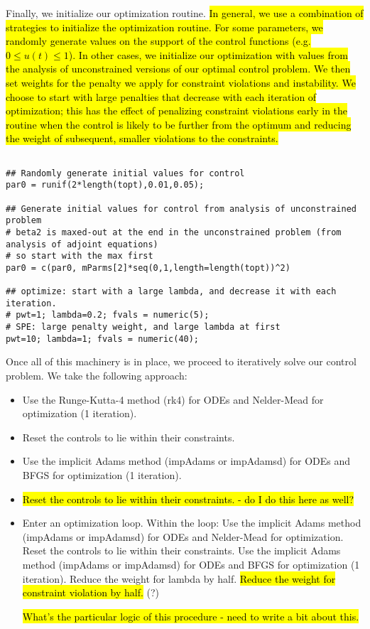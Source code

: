 \documentclass[12pt, oneside]{article}   	%
\begin{document}
Finally, we initialize our optimization routine. \hl{In general, we use a combination of strategies to initialize the optimization routine. For some parameters, we randomly generate values on the support of the control functions (e.g. $0\leq u(t) \leq 1$). In other cases, we initialize our optimization with values from the analysis of unconstrained versions of our optimal control problem. We then set weights for the penalty we apply for constraint violations and instability. We choose to start with large penalties that decrease with each iteration of optimization; this has the effect of penalizing constraint violations early in the routine when the control is likely to be further from the optimum and reducing the weight of subsequent, smaller violations to the constraints.}

\begin{lstlisting}

## Randomly generate initial values for control
par0 = runif(2*length(topt),0.01,0.05); 

## Generate initial values for control from analysis of unconstrained problem
# beta2 is maxed-out at the end in the unconstrained problem (from analysis of adjoint equations)   
# so start with the max first
par0 = c(par0, mParms[2]*seq(0,1,length=length(topt))^2) 

## optimize: start with a large lambda, and decrease it with each iteration. 
# pwt=1; lambda=0.2; fvals = numeric(5);  
# SPE: large penalty weight, and large lambda at first 
pwt=10; lambda=1; fvals = numeric(40);  

\end{lstlisting}

Once all of this machinery is in place, we proceed to iteratively solve our control problem. We take the following approach:

\begin{itemize}
\item Use the Runge-Kutta-4 method (rk4) for ODEs and Nelder-Mead for optimization (1 iteration).
\item Reset the controls to lie within their constraints.
\item Use the implicit Adams method (impAdams or impAdamsd) for ODEs and BFGS for optimization (1 iteration).
\item \hl{Reset the controls to lie within their constraints. - do I do this here as well?}
\item Enter an optimization loop. Within the loop:
\subitem Use the implicit Adams method (impAdams or impAdamsd) for ODEs and Nelder-Mead for optimization.
\subitem Reset the controls to lie within their constraints.
\subitem Use the implicit Adams method (impAdams or impAdamsd) for ODEs and BFGS for optimization (1 iteration).
\subitem Reduce the weight for lambda by half.
\subitem \hl{Reduce the weight for constraint violation by half.} (?)

\hl{What's the particular logic of this procedure - need to write a bit about this. }

\end{itemize}
\end{document}
